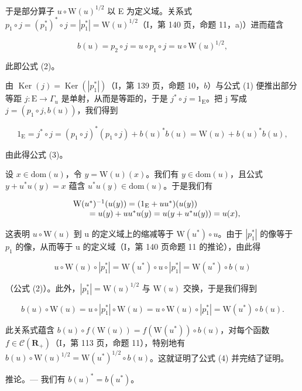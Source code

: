 于是部分算子 \(u \circ \mathrm{W}(u)^{1/2}\) 以 E 为定义域。关系式 \(p_1 \circ j = (p_1^*)^* \circ j = |p_1^*| = \mathrm{W}(u)^{1/2}\)（I，第 140 页，命题 11，a)）进而蕴含

\[
b (u) = p _ {2} \circ j = u \circ p _ {1} \circ j = u \circ \mathrm{W} (u) ^ {1 / 2},
\]

此即公式 (2)。

由 \(\operatorname{Ker}(j) = \operatorname{Ker}(|p_1^*|)\)（I，第 139 页，命题 10，\(b\)）与公式 (1) 便推出部分等距 \(j: \mathrm{E} \to \Gamma_u\) 是单射，从而是等距的，于是 \(j^* \circ j = 1_{\mathrm{E}}\)。把 j 写成 \(j = (p_1 \circ j, b(u))\)，我们得到

\[
1 _ {\mathrm{E}} = j ^ {*} \circ j = (p _ {1} \circ j) ^ {*} (p _ {1} \circ j) + b (u) ^ {*} b (u) = \mathrm{W} (u) + b (u) ^ {*} b (u),
\]

由此得公式 (3)。

设 \(x \in \mathrm{dom}(u)\)，令 \(y = \mathrm{W}(u)(x)\)。我们有 \(y \in \mathrm{dom}(u)\)，且公式 \(y + u^{*}u(y) = x\) 蕴含 \(u^{*}u(y) \in \mathrm{dom}(u)\)。于是我们有

\[
\begin{array}{r l} & {\mathrm{W} (u ^ {*}) ^ {- 1} (u (y)) = (1 _ {\mathrm{E}} + u u ^ {*}) (u (y))} \\ & {\qquad = u (y) + u u ^ {*} u (y) = u (y + u ^ {*} u (y)) = u (x),} \end{array}
\]

这表明 \(u \circ \mathrm{W}(u)\) 到 u 的定义域上的缩减等于 \(\mathrm{W}(u^{*}) \circ u\)。由于 \(|p_{1}^{*}|\) 的像等于 \(p_{1}\) 的像，从而等于 u 的定义域（I，第 140 页命题 11 的推论），由此得

\[
u \circ \mathrm{W} (u) \circ | p _ {1} ^ {*} | = \mathrm{W} (u ^ {*}) \circ u \circ | p _ {1} ^ {*} | = \mathrm{W} (u ^ {*}) \circ b (u)
\]

（公式 (2)）。此外，\(|p_{1}^{*}| = \mathrm{W}(u)^{1/2}\) 与 \(\mathrm{W}(u)\) 交换，于是我们得到

\[
b (u) \circ \mathrm{W} (u) = u \circ | p _ {1} ^ {*} | \circ \mathrm{W} (u) = u \circ \mathrm{W} (u) \circ | p _ {1} ^ {*} | = \mathrm{W} (u ^ {*}) \circ b (u).
\]

此关系式蕴含 \(b(u) \circ f(\mathrm{W}(u)) = f(\mathrm{W}(u^{*})) \circ b(u)\)，对每个函数 \(f \in \mathcal{C}(\mathbf{R}_{+})\)（I，第 113 页，命题 11），特别地有 \(b(u) \circ \mathrm{W}(u)^{1/2} = \mathrm{W}(u^{*})^{1/2} \circ b(u)\)。这就证明了公式 (4) 并完结了证明。

推论。--- 我们有 \(b(u)^{*} = b(u^{*})\)。


